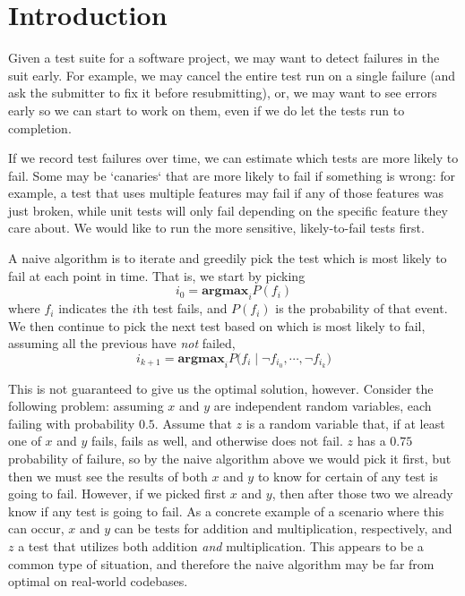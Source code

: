 \documentclass[12pt]{article}
\begin{document}
\maketitle


\section{Introduction}
Given a test suite for a software project, we may want to detect failures in the suit early. For example, we may cancel the entire test run on a single failure (and ask the submitter to fix it before resubmitting), or, we may want to see errors early so we can start to work on them, even if we do let the tests run to completion.

If we record test failures over time, we can estimate which tests are more likely to fail. Some may be `canaries` that are more likely to fail if something is wrong: for example, a test that uses multiple features may fail if any of those features was just broken, while unit tests will only fail depending on the specific feature they care about. We would like to run the more sensitive, likely-to-fail tests first.

A naive algorithm is to iterate and greedily pick the test which is most likely to fail at each point in time. That is, we start by picking
\[ i_0 = \textbf{argmax}_{i} P(f_i) \]
where $f_i$ indicates the $i$th test fails, and $P(f_i)$ is the probability of that event. We then continue to pick the next test based on which is most likely to fail, assuming all the previous have \emph{not} failed,
\[ i_{k+1} = \textbf{argmax}_{i} P\Big(f_i \; \Big| \; \neg f_{i_0}, \cdots , \neg f_{i_k} \Big) \]

This is not guaranteed to give us the optimal solution, however. Consider the following problem: assuming $x$ and $y$ are independent random variables, each failing with probability $0.5$. Assume that $z$ is a random variable that, if at least one of $x$ and $y$ fails, fails as well, and otherwise does not fail. $z$ has a $0.75$ probability of failure, so by the naive algorithm above we would pick it first, but then we must see the results of both $x$ and $y$ to know for certain of any test is going to fail. However, if we picked first $x$ and $y$, then after those two we already know if any test is going to fail. As a concrete example of a scenario where this can occur, $x$ and $y$ can be tests for addition and multiplication, respectively, and $z$ a test that utilizes both addition \emph{and} multiplication. This appears to be a common type of situation, and therefore the naive algorithm may be far from optimal on real-world codebases.
\end{document}
